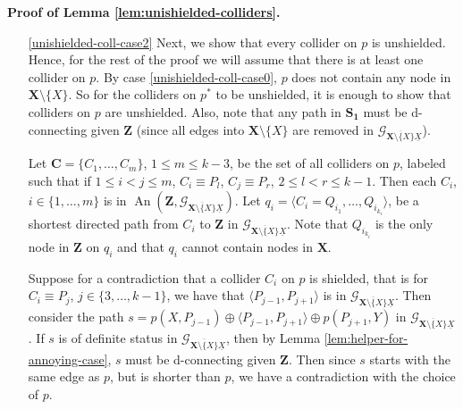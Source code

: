 \documentclass[11pt]{article}
\DeclareMathOperator{\An}{An}
\newcommand{\mb}[1]{\mathbf{#1}}
\newcommand{\g}[1][G]{\mathcal{#1}}
\newenvironment{proofofnoqed}[1][]{\noindent \textbf{Proof of #1.}}{}
\begin{document}
\begin{proofofnoqed}[Lemma \ref{lem:unishielded-colliders}]
\begin{enumerate}[label = (\roman*)]
        If $p^{*}$ is of definite status, then since $P_l \gets P_{l+1}$, $l \in \{1,\dots, j\}$ is not on $p^{*}(X,P_{j+1})$, we have that $p^{*}(X,P_{j+1})$ is possibly causal in $\g$ (Lemma \ref{lem:pc-def-stat}). Therefore, $X \gets P_{j+1}$ being in $\g$ is a contradiction. 

        Otherwise, $p^{*}$ is not of definite status in $\g$. This implies that $X \to P_{3}$ is in $\g$ (and not in $\g_{\overline{\mb{X} \setminus \{X\}} \underline{X}}$). Moreover, case \ref{unishielded-coll-case0} implies that $p^{*}(P_2, P_{j+1})$ is of definite status. Hence, since $P_l \gets P_{l+1}$, $l \in \{1,\dots, j\}$ is not on $p^{*}(X,P_{j+1})$, we have that $p^{*}(P_2,P_{j+1})$ is possibly causal in $\g$ (Lemma \ref{lem:pc-def-stat}). But then the fact that $p^{*}(P_3,P_{j+1})$ is possibly causal and $P_{j+1} \to X \to P_{3}$ is in $\g$, contradicts Lemma \ref{lem:nobackpaths}.

        \item[\ref{unishielded-coll-case2}]
        Next, we show that every collider on $p$ is unshielded. Hence, for the rest of the proof we will assume that there is at least one collider on $p$. By case \ref{unishielded-coll-case0}, $p$ does not contain any node in $\mb{X} \setminus \{X\}$. So for the colliders on $p^{*}$ to be unshielded, it is enough to show that colliders on $p$ are unshielded. Also, note that any path in $\mb{S_1}$ must be d-connecting given $\mb{Z}$ (since all edges into $\mb{X} \setminus \{X\}$ are removed in $\g_{\overline{\mb{X} \setminus \{X\}} \underline{X}}$).

        Let $\mb{C} = \{C_1, \dots, C_m \}$, $1 \le m \le k-3$, be the set of all colliders on $p$, labeled such that if $1 \le i< j \le m$, $C_i \equiv P_l$, $C_j \equiv P_r$, $2 \le l < r \le k-1$. Then each $C_i$, $i \in \{1, \dots, m\}$ is in $\An(\mb{Z},\g_{\overline{\mb{X} \setminus \{X\}} \underline{X}})$. Let $q_i = \langle C_i = Q_{i_1}, \dots, Q_{i_{k_i}} \rangle$, be a shortest directed path from $C_i$ to $\mb{Z}$ in $\g_{\overline{\mb{X} \setminus \{X\}} \underline{X}}$. Note that $Q_{i_{k_i}}$ is the only node in $\mb{Z}$ on $q_i$ and that $q_i$ cannot contain nodes in $\mb{X}$.

        Suppose for a contradiction that a collider $C_i$ on $p$ is shielded, that is for $C_i \equiv P_j$, $j \in \{3, \dots, k-1\}$, we have that $\langle P_{j-1}, P_{j+1} \rangle$ is in $\g_{\overline{\mb{X} \setminus \{X\}} \underline{X}}$. Then consider the path $s = p(X,P_{j-1}) \oplus \langle P_{j-1}, P_{j+1} \rangle \oplus p(P_{j+1}, Y)$ in $\g_{\overline{\mb{X} \setminus \{X\}} \underline{X}}$. If $s$ is of definite status in $\g_{\overline{\mb{X} \setminus \{X\}} \underline{X}}$, then by Lemma \ref{lem:helper-for-annoying-case}, $s$ must be d-connecting given $\mb{Z}$. Then since $s$ starts with the same edge as $p$, but is shorter than $p$, we have a contradiction with the choice of $p$.


\end{enumerate}
\end{proofofnoqed}
\end{document}
